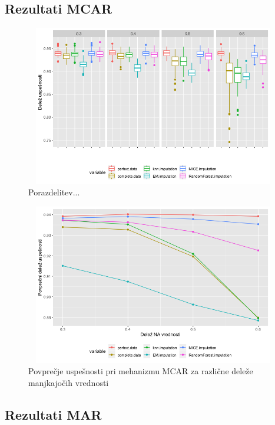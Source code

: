 \documentclass[12pt,a4paper]{article}
\begin{document}
\subsection{Rezultati MCAR}

\begin{figure}[ht]
	\centering
	\includegraphics[width= 12cm, height = 7cm]{img/MCAR_boxplot.png}
	\caption{Porazdelitev...} 
	\label{fig:3}
\end{figure}




\begin{figure}[ht]
	\centering
	\includegraphics[width= 12cm, height = 7cm]{img/MCAR_mean_line.png}
	\caption{Povprečje uspešnosti pri mehanizmu MCAR za različne deleže manjkajočih vrednosti} 
	\label{fig:4}
\end{figure}

\pagebreak

\subsection{Rezultati MAR}
\end{document}

